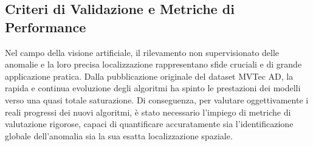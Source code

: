 \subsection{Criteri di Validazione e Metriche di Performance}

Nel campo della visione artificiale, il rilevamento non supervisionato delle anomalie e la loro precisa localizzazione rappresentano sfide cruciali e di grande applicazione pratica. \cite{Zheng_et_al._2022} Dalla pubblicazione originale del dataset MVTec AD, la rapida e continua evoluzione degli algoritmi ha spinto le prestazioni dei modelli verso una quasi totale saturazione. \cite{Zheng_et_al._2022} Di conseguenza, per valutare oggettivamente i reali progressi dei nuovi algoritmi, è stato necessario l'impiego di metriche di valutazione rigorose, capaci di quantificare accuratamente sia l'identificazione globale dell'anomalia sia la sua esatta localizzazione spaziale. \cite{Zheng_et_al._2022}


